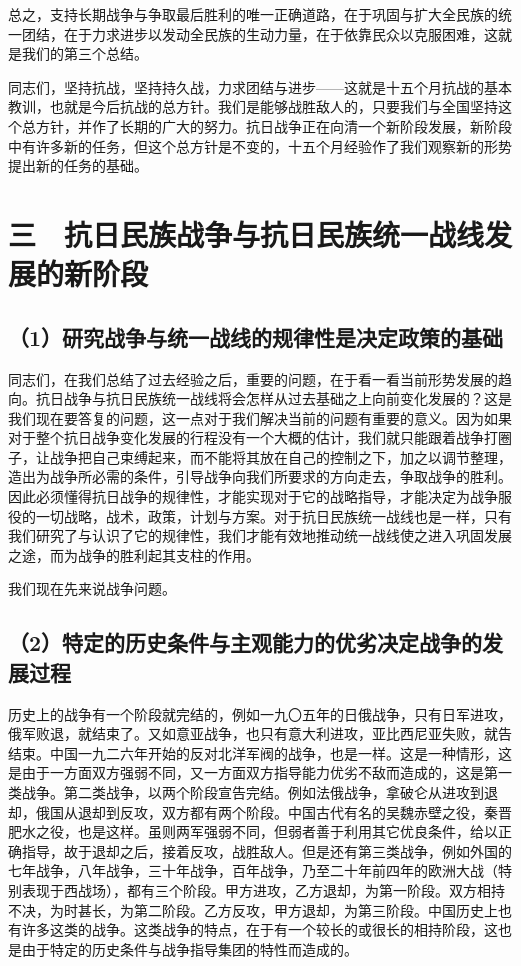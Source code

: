 总之，支持长期战争与争取最后胜利的唯一正确道路，在于巩固与扩大全民族的统一团结，在于力求进步以发动全民族的生动力量，在于依靠民众以克服困难，这就是我们的第三个总结。

同志们，坚持抗战，坚持持久战，力求团结与进步——这就是十五个月抗战的基本教训，也就是今后抗战的总方针。我们是能够战胜敌人的，只要我们与全国坚持这个总方针，并作了长期的广大的努力。抗日战争正在向清一个新阶段发展，新阶段中有许多新的任务，但这个总方针是不变的，十五个月经验作了我们观察新的形势提出新的任务的基础。

\section{三　抗日民族战争与抗日民族统一战线发展的新阶段}

\subsection{（1）研究战争与统一战线的规律性是决定政策的基础}

同志们，在我们总结了过去经验之后，重要的问题，在于看一看当前形势发展的趋向。抗日战争与抗日民族统一战线将会怎样从过去基础之上向前变化发展的？这是我们现在要答复的问题，这一点对于我们解决当前的问题有重要的意义。因为如果对于整个抗日战争变化发展的行程没有一个大概的估计，我们就只能跟着战争打圈子，让战争把自己束缚起来，而不能将其放在自己的控制之下，加之以调节整理，造出为战争所必需的条件，引导战争向我们所要求的方向走去，争取战争的胜利。因此必须懂得抗日战争的规律性，才能实现对于它的战略指导，才能决定为战争服役的一切战略，战术，政策，计划与方案。对于抗日民族统一战线也是一样，只有我们研究了与认识了它的规律性，我们才能有效地推动统一战线使之进入巩固发展之途，而为战争的胜利起其支柱的作用。

我们现在先来说战争问题。

\subsection{（2）特定的历史条件与主观能力的优劣决定战争的发展过程}

历史上的战争有一个阶段就完结的，例如一九〇五年的日俄战争，只有日军进攻，俄军败退，就结束了。又如意亚战争，也只有意大利进攻，亚比西尼亚失败，就告结束。中国一九二六年开始的反对北洋军阀的战争，也是一样。这是一种情形，这是由于一方面双方强弱不同，又一方面双方指导能力优劣不敌而造成的，这是第一类战争。第二类战争，以两个阶段宣告完结。例如法俄战争，拿破仑从进攻到退却，俄国从退却到反攻，双方都有两个阶段。中国古代有名的吴魏赤壁之役，秦晋肥水之役，也是这样。虽则两军强弱不同，但弱者善于利用其它优良条件，给以正确指导，故于退却之后，接着反攻，战胜敌人。但是还有第三类战争，例如外国的七年战争，八年战争，三十年战争，百年战争，乃至二十年前四年的欧洲大战（特别表现于西战场），都有三个阶段。甲方进攻，乙方退却，为第一阶段。双方相持不决，为时甚长，为第二阶段。乙方反攻，甲方退却，为第三阶段。中国历史上也有许多这类的战争。这类战争的特点，在于有一个较长的或很长的相持阶段，这也是由于特定的历史条件与战争指导集团的特性而造成的。

